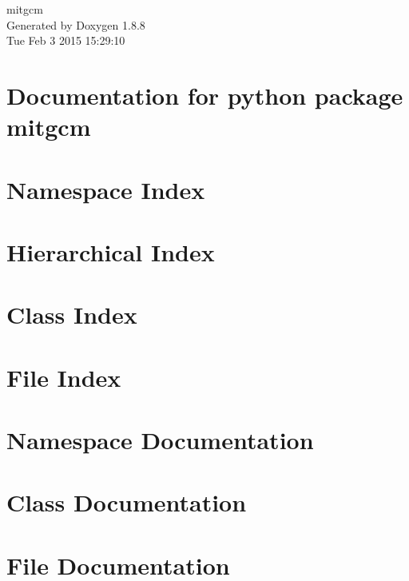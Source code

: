 \documentclass[twoside]{book}
\newcommand{\+}{\discretionary{\mbox{\scriptsize$\hookleftarrow$}}{}{}}
\newcommand{\clearemptydoublepage}{%
  \newpage{\pagestyle{empty}\cleardoublepage}%
}
\begin{document}
\hypersetup{pageanchor=false,
             bookmarks=true,
             bookmarksnumbered=true,
             pdfencoding=unicode
            }
\begin{titlepage}
\vspace*{7cm}
\begin{center}%
{\Large mitgcm }\\
\vspace*{1cm}
{\large Generated by Doxygen 1.8.8}\\
\vspace*{0.5cm}
{\small Tue Feb 3 2015 15:29:10}\\
\end{center}
\end{titlepage}
\clearemptydoublepage
\tableofcontents
\clearemptydoublepage
{}
\hypersetup{pageanchor=true}

\chapter{Documentation for python package mitgcm}
\label{index}\hypertarget{index}{}
\chapter{Namespace Index}

\chapter{Hierarchical Index}

\chapter{Class Index}

\chapter{File Index}

\chapter{Namespace Documentation}




\chapter{Class Documentation}














\chapter{File Documentation}





\newpage
{}
{}
\printindex
\end{document}
